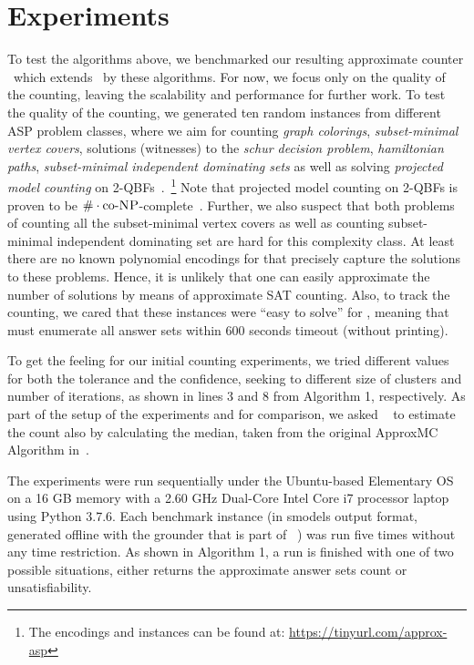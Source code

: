\section{Experiments} \label{sec:experiments}

To test the algorithms above, we benchmarked our resulting approximate counter \xampler\, which extends \xorro\, by these algorithms.
For now, we focus only on the quality of the counting, leaving the scalability and performance for further work.
%
To test the quality of the counting,
we generated ten random instances from different ASP problem classes, where we aim for counting \emph{graph colorings}, \emph{subset-minimal vertex covers}, solutions (witnesses) to the \emph{schur decision problem}, \emph{hamiltonian paths}, \emph{subset-minimal independent dominating sets} as well as solving \emph{projected model counting} on 2-QBFs~\cite{DurandHermannKolaitis05,KleineBuningLettman99}.~\footnote{The encodings and instances can be found at: \url{https://tinyurl.com/approx-asp}}
Note that projected model counting on 2-QBFs is proven to be $\#\cdot\text{co-}\textsc{NP}$-complete~\cite{DurandHermannKolaitis05}. Further, we also suspect that both problems of counting all the subset-minimal vertex covers as well as counting subset-minimal independent dominating set are hard for this complexity class. At least there are no known polynomial encodings for \SAT that precisely capture the solutions to these problems. Hence, it is unlikely that one can easily approximate the number of solutions by means of approximate SAT counting.
Also, to track the counting, we cared that these instances were ``easy to solve'' for \clingo{},
meaning that \clingo{} must enumerate all answer sets within 600 seconds timeout (without printing).

To get the feeling for our initial counting experiments, we tried different values for both the tolerance and the confidence, seeking to different size of clusters and number of iterations,
as shown in lines 3 and 8 from Algorithm 1, respectively.
As part of the setup of the experiments and for comparison, we asked \xorro{}~\cite{DBLP:conf/lpnmr/EverardoJKS19}  to estimate the count also by calculating the median, taken from the original ApproxMC Algorithm in~\cite{ChakrabortyMV13}.

The experiments were run sequentially under the Ubuntu-based Elementary OS on a 16 GB memory with a 2.60 GHz Dual-Core Intel Core i7 processor laptop using Python 3.7.6.
Each benchmark instance (in smodels output format, generated offline with the grounder \gringo{} that is part of \clingo{}~\cite{DBLP:conf/iclp/GebserKKOSW16}) was run five times without any time restriction. 
As shown in Algorithm 1, a run is finished with one of two possible situations, either \xorro{} returns the approximate answer sets count or unsatisfiability.

